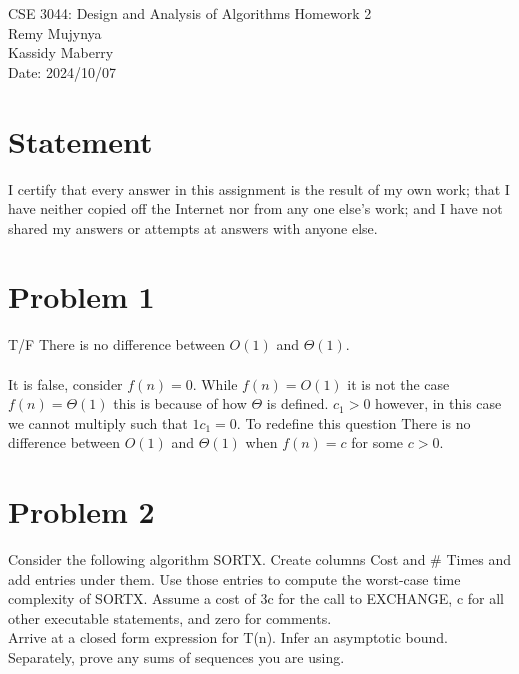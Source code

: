 \documentclass{article}
\begin{document}
\begin{center}
    {\huge
        CSE 3044: Design and Analysis of Algorithms Homework 2\\
    }
    {\large Remy Mujynya\\
          Kassidy Maberry\\}
    Date: 2024/10/07
\end{center}
\section*{Statement}
I certify that every answer in this assignment is the result of my own work; that
I have neither copied off the Internet nor from any one else's work; and I have
not shared my answers or attempts at answers with anyone else.\\

\section*{Problem 1}
T/F There is no difference between $O(1)$ and $\Theta(1)$.\\\\

It is false, consider $f(n) = 0$. While $f(n) = O(1)$ it is not 
the case $f(n) = \Theta(1)$ this is because of how $\Theta$ is defined.
$c_{1} > 0$ however, in this case we cannot multiply such that $1c_{1} = 0$.
To redefine this question There is no difference between $O(1)$ and $\Theta(1)$ when 
$f(n) = c$ for some $c > 0$.\\

\section*{Problem 2}
Consider the following algorithm SORTX. Create columns Cost and \# Times and add
entries under them. Use those entries to compute the worst-case time complexity
of SORTX. Assume a cost of 3c for the call to EXCHANGE, c for all other executable
statements, and zero for comments.\\
Arrive at a closed form expression for T(n). Infer an asymptotic bound.\\
Separately, prove any sums of sequences you are using.\\\\
\end{document}
